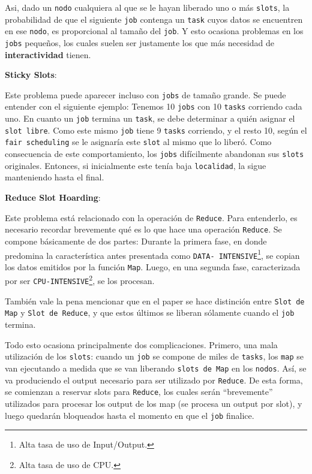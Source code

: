 \documentclass[11pt, a4paper, twoside]{article}
\begin{document}
Asi, dado un \texttt{nodo} cualquiera al que se le hayan liberado uno o más
\texttt{slots}, la probabilidad de que el siguiente \texttt{job} contenga un
\texttt{task} cuyos datos se encuentren en ese \texttt{nodo}, es proporcional al
tamaño del \texttt{job}. Y esto ocasiona problemas en los \texttt{jobs}
pequeños, los cuales suelen ser justamente los que más necesidad de
\textbf{interactividad} tienen.


\textbf{Sticky Slots}:

Este problema puede aparecer incluso con \texttt{jobs} de tamaño grande. Se
puede entender con el siguiente ejemplo: Tenemos 10 \texttt{jobs} con 10
\texttt{tasks} corriendo cada uno. En cuanto un \texttt{job} termina un
\texttt{task}, se debe determinar a quién asignar el \texttt{slot libre}. Como
este mismo \texttt{job} tiene 9 \texttt{tasks} corriendo, y el resto 10, según
el \texttt{fair scheduling} se le asignaría este \texttt{slot} al mismo que lo
liberó. Como consecuencia de este comportamiento, los \texttt{jobs} difícilmente
abandonan sus \texttt{slots} originales. Entonces, si inicialmente este tenía
baja \texttt{localidad}, la sigue manteniendo hasta el final.


\textbf{Reduce Slot Hoarding}:

Este problema está relacionado con la operación de \texttt{Reduce}. Para
entenderlo, es necesario recordar brevemente qué es lo que hace una operación
\texttt{Reduce}. Se compone básicamente de dos partes: Durante la primera fase,
en donde predomina la característica antes presentada como \texttt{DATA-
INTENSIVE}\footnote{Alta tasa de uso de Input/Output.}, se copian los datos
emitidos por la función \texttt{Map}. Luego, en una segunda fase, caracterizada
por ser \texttt{CPU-INTENSIVE}\footnote{Alta tasa de uso de CPU.}, se los
procesan.

También vale la pena mencionar que en el paper se hace distinción entre
\texttt{Slot de Map} y \texttt{Slot de Reduce}, y que estos últimos se liberan
sólamente cuando el \texttt{job} termina.

Todo esto ocasiona principalmente dos complicaciones. Primero, una mala
utilización de los \texttt{slots}: cuando un \texttt{job} se compone de miles de
\texttt{tasks}, los \texttt{map} se van ejecutando a medida que se van liberando
\texttt{slots de Map} en los \texttt{nodos}. Así, se va produciendo el output
necesario para ser utilizado por \texttt{Reduce}. De esta forma, se comienzan a
reservar slots para \texttt{Reduce}, los cuales serán ``brevemente'' utilizados
para procesar los output de los map (se procesa un output por slot), y luego
quedarán bloqueados hasta el momento en que el \texttt{job} finalice.
\end{document}
